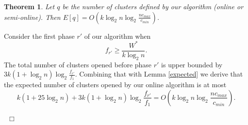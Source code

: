 \documentclass{article}
\newtheorem{theorem}{Theorem}
\newenvironment{proof}{\medskip\noindent {\bf Proof.}}{~\hfill$\Box$\medskip}
\begin{document}
\begin{theorem}
Let $q$ be the number of clusters defined by our algorithm (online or semi-online). Then $E[q]=O\left(k \log_2 n \log_2 \frac{n c_{max}}{c_{min}}\right)$.
\end{theorem}
\begin{proof}
Consider the first phase $r'$ of our algorithm when $$f_{r'}\ge \frac{W^*}{k\log_2 n}.$$
The total number of clusters opened before phase $r'$ is upper bounded by $3k (1+\log_2 n)\log_2\frac{ f_{r'}}{f_1}$.
Combining that with Lemma \ref{expected} we derive that the expected number of clusters opened by our online algorithm is at most 
$$k(1+25\log_2 n) +3k(1+\log_2 n) \log_2\frac{ f_{r'}}{f_1}=O\left(k\log_2 n \log_2 \frac{n c_{max}}{c_{min}}\right).$$

\end{proof}
\end{document}
